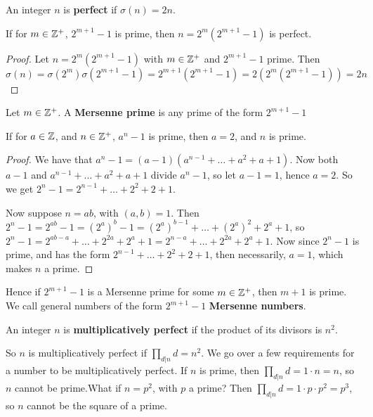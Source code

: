 \begin{definition}
    An integer $n$ is \textbf{perfect} if $\sigma(n)=2n$. 
\end{definition}

\begin{lemma}\label{lemma2.2.7}
    If for $m \in \mathbb{Z}^+$, $2^{m+1}-1$ is prime, then $n=2^m(2^{m+1}-1)$ is perfect.
\end{lemma}
\begin{proof}
    Let $n=2^m(2^{m+1}-1)$ with $m \in \mathbb{Z}^+$ and $2^{m+1}-1$ prime. Then $\sigma(n)=\sigma(2^m)\sigma(2^{m+1}-1)=2^{m+1}(2^{m+1}-1)=2(2^m(2^{m+1}-1))=2n$
\end{proof}

\begin{definition}
    Let $m \in \mathbb{Z}^+$. A \textbf{Mersenne prime} is any prime of the form $2^{m+1}-1$
\end{definition}

\begin{lemma}\label{lemma2.2.8}
    If for $a \in \mathbb{Z}$, and $n \in \mathbb{Z}^+$, $a^n-1$ is prime, then $a=2$, and $n$ is prime.
\end{lemma}
\begin{proof}
    We have that $a^n-1=(a-1)(a^{n-1}+\dots+a^2+a+1)$. Now both $a-1$ and $a^{n-1}+\dots+a^2+a+1$ divide $a^n-1$, so let $a-1=1$, hence $a=2$. So we get $2^n-1=2^{n-1}+\dots+2^2+2+1$.
    
    Now suppose $n=ab$, with $(a,b)=1$. Then $2^n-1=2^{ab}-1=(2^a)^b-1=(2^a)^{b-1}+\dots+(2^a)^2+2^a+1$, so $2^n-1=2^{ab-a}+\dots+2^{2a}+2^a+1=2^{n-a}+\dots+2^{2a}+2^a+1$. Now since $2^n-1$ is prime, and has the form $2^{n-1}+\dots+2^2+2+1$, then necessarily, $a=1$, which makes $n$ a prime.
\end{proof}

Hence if $2^{m+1}-1$ is a Mersenne prime for some $m \in \mathbb{Z}^+$, then $m+1$ is prime. We call general numbers of the form $2^{m+1}-1$ \textbf{Mersenne numbers}.

\begin{definition}
    An integer $n$ is \textbf{multiplicatively perfect} if the product of its divisors is $n^2$.
\end{definition}

So $n$ is multiplicatively perfect if $\prod_{d|n} d=n^2$. We go over a few requirements for a number to be multiplicatively perfect. If $n$ is prime, then $\prod_{d|n} d=1 \cdot n=n$, so $n$ cannot be prime.What if $n=p^2$, with $p$ a prime? Then $\prod_{d|n} d=1 \cdot p \cdot p^2=p^3$, so $n$ cannot be the square of a prime.

